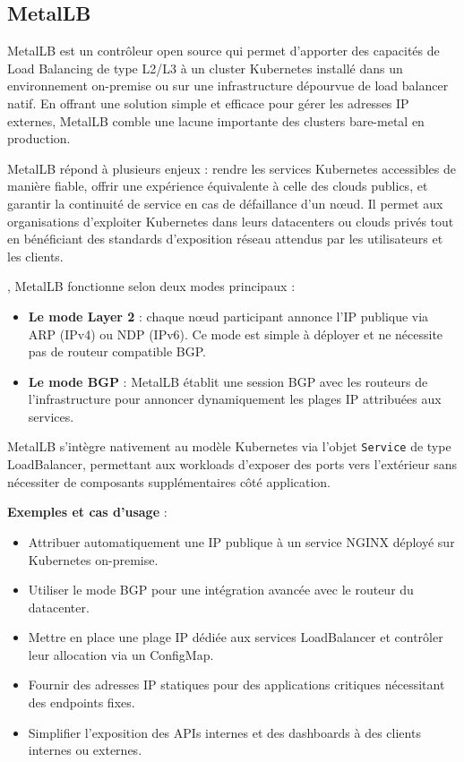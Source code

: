 \subsection{MetalLB}

MetalLB est un contrôleur open source qui permet d’apporter des capacités de Load Balancing de type L2/L3 à un cluster Kubernetes installé dans un environnement on-premise ou sur une infrastructure dépourvue de load balancer natif. En offrant une solution simple et efficace pour gérer les adresses IP externes, MetalLB comble une lacune importante des clusters bare-metal en production.

 MetalLB répond à plusieurs enjeux  : rendre les services Kubernetes accessibles de manière fiable, offrir une expérience équivalente à celle des clouds publics, et garantir la continuité de service en cas de défaillance d’un nœud. Il permet aux organisations d’exploiter Kubernetes dans leurs datacenters ou clouds privés tout en bénéficiant des standards d’exposition réseau attendus par les utilisateurs et les clients.

, MetalLB fonctionne selon deux modes principaux :
\begin{itemize}
	\item \textbf{Le mode Layer 2}  : chaque nœud participant annonce l’IP publique via ARP (IPv4) ou NDP (IPv6). Ce mode est simple à déployer et ne nécessite pas de routeur compatible BGP.
	\item \textbf{Le mode BGP}  : MetalLB établit une session BGP avec les routeurs de l’infrastructure pour annoncer dynamiquement les plages IP attribuées aux services.
\end{itemize}

MetalLB s’intègre nativement au modèle Kubernetes via l’objet \texttt{Service} de type LoadBalancer, permettant aux workloads d’exposer des ports vers l’extérieur sans nécessiter de composants supplémentaires côté application.

\textbf{Exemples et cas d’usage} :
\begin{itemize}
	\item Attribuer automatiquement une IP publique à un service NGINX déployé sur Kubernetes on-premise.
	\item Utiliser le mode BGP pour une intégration avancée avec le routeur du datacenter.
	\item Mettre en place une plage IP dédiée aux services LoadBalancer et contrôler leur allocation via un ConfigMap.
	\item Fournir des adresses IP statiques pour des applications critiques nécessitant des endpoints fixes.
	\item Simplifier l’exposition des APIs internes et des dashboards à des clients internes ou externes.
\end{itemize}

